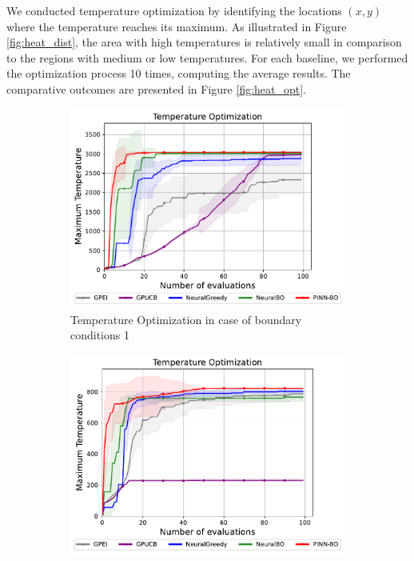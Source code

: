 We conducted temperature optimization by identifying the locations $(x,y)$ where the temperature reaches its maximum. As illustrated in Figure \ref{fig:heat_dist}, the area with high temperatures is relatively small in comparison to the regions with medium or low temperatures. For each baseline, we performed the optimization process 10 times, computing the average results. The comparative outcomes are presented in Figure \ref{fig:heat_opt}. 
\begin{figure}[ht]
    \centering
    \begin{subfigure}[b]{0.49\textwidth}
        \centering
    \includegraphics[width=\textwidth]{Figures/PINN-BO/Heat_dim_2_bc1.pdf}
        \caption{Temperature Optimization in case of boundary conditions 1}
 \label{fig:heat_1_opt}
    \end{subfigure}
    \hfill
    \begin{subfigure}[b]{0.49\textwidth}
        \centering
        \includegraphics[width=1\textwidth]{Figures/PINN-BO/Heat_dim_2_bc2.pdf}

\end{subfigure}
\end{figure}
